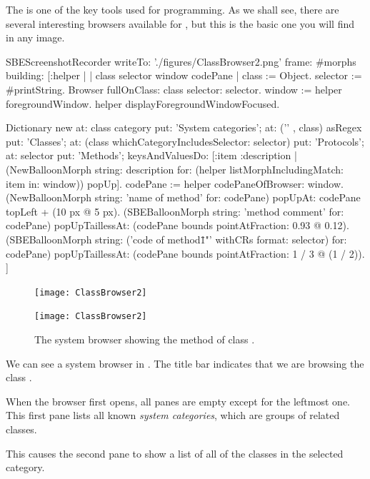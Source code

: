 \documentclass[a4paper,10pt,twoside]{book}
\begin{document}
The  is one of the key tools used for programming.
As we shall see, there are several interesting browsers available for \sq, but this is the basic one you will find in any image.


\begin{ExecuteSmalltalkScript}
SBEScreenshotRecorder writeTo: './figures/ClassBrowser2.png' frame: #morphs building: [:helper |
	| class selector window codePane |
	class := Object. selector := #printString.
	Browser fullOnClass: class selector: selector.
	window := helper foregroundWindow.
	helper displayForegroundWindowFocused.

	Dictionary new
		at: class category put: 'System categories';
		at: ('\s*' , class) asRegex put: 'Classes';
		at: (class whichCategoryIncludesSelector: selector) put: 'Protocols';
		at: selector put: 'Methods';
		keysAndValuesDo: [:item :description |
			(NewBalloonMorph string: description for: (helper listMorphIncludingMatch: item in: window))
				popUp].
	codePane := helper codePaneOfBrowser: window.
	(NewBalloonMorph string: 'name of method' for: codePane)
			popUpAt: codePane topLeft + (10 px @ 5 px).
	(SBEBalloonMorph string: 'method comment' for: codePane)
			popUpTaillessAt: (codePane bounds pointAtFraction: 0.93 @ 0.12).
	(SBEBalloonMorph
		string: ('code of method\"{1}"' withCRs format: {selector})
		for: codePane)
			popUpTaillessAt: (codePane bounds pointAtFraction: 1 / 3 @ (1 / 2)).
]
\end{ExecuteSmalltalkScript}
\begin{figure}[htb]
\ifluluelse
	{\centerline {\texttt{[image: ClassBrowser2]}}}
	{\centerline {\texttt{[image: ClassBrowser2]}}}
\caption{The system browser showing the  method of class .
\label{fig:classBrowser}}
\end{figure}

We can see a system browser in .
The title bar indicates that we are browsing the class .

When the browser first opens, all panes are empty except for the leftmost one.
This first pane lists all known \emph{system categories}, which are groups of related classes.

This causes the second pane to show a list of all of the classes in the selected category.
\end{document}
